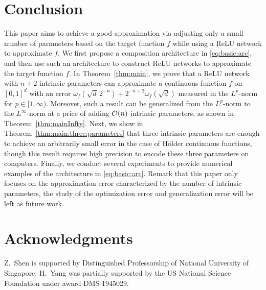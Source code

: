 \documentclass[nohyperref]{article}
\theoremstyle{plain}
\theoremstyle{definition}
\theoremstyle{remark}
\begin{document}
\section{Conclusion}\label{sec:conclusion}
This paper aims to achieve a good approximation  via adjusting only a small number of parameters based on the target function $f$ while using a ReLU network to approximate $f$.
We first propose a composition architecture in \eqref{eq:basic:arc}, and then use such an architecture to construct ReLU networks to approximate the target function $f$.
 In Theorem~\ref{thm:main}, we prove that a ReLU network with $n+2$ intrinsic parameters can approximate a continuous function $f$ on $[0,1]^d$ with an error $\omega_f(\sqrt{d}\, 2^{-n})+2^{-n+2}\omega_f(\sqrt{d})$ measured in the $L^p$-norm for $p\in [1,\infty)$.
Moreover, such a result can be generalized from the $L^p$-norm to the $L^\infty$-norm at a price of adding ${\mathcal{O}}(n)$ intrinsic parameters, as shown in Theorem~\ref{thm:mainInfty}. Next, we show in Theorem~\ref{thm:main:three:parameters} that three intrinsic parameters are enough to achieve an arbitrarily small error
in the case of H\"older continuous functions, though this result requires high precision to encode these three parameters on computers.
Finally, we conduct several experiments to provide numerical examples of
the architecture in \eqref{eq:basic:arc}.
Remark that this paper only focuses on the approximation error characterized by the number of intrinsic parameters, the study of the optimization error and generalization error will be left as future work. 

\section*{Acknowledgments}
Z.~Shen is supported by 
Distinguished Professorship of National University of Singapore.
H.~Yang was partially supported by the US National Science Foundation under award DMS-1945029. 
\end{document}
